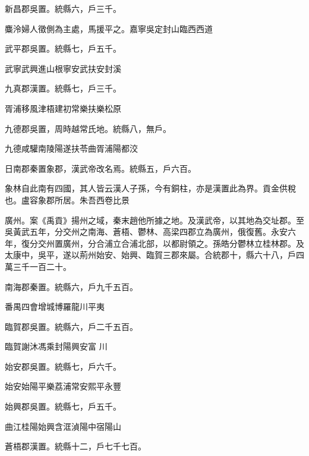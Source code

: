 \begin{pinyinscope}
 新昌郡吳置。統縣六，戶三千。



 麋泠婦人徵側為主處，馬援平之。嘉寧吳定封山臨西西道



 武平郡吳置。統縣七，戶五千。



 武寧武興進山根寧安武扶安封溪



 九真郡漢置。統縣七，戶三千。



 胥浦移風津梧建初常樂扶樂松原



 九德郡吳置，周時越常氏地。統縣八，無戶。



 九德咸驩南陵陽遂扶苓曲胥浦陽都洨



 日南郡秦置象郡，漢武帝改名焉。統縣五，戶六百。



 象林自此南有四國，其人皆云漢人子孫，今有銅柱，亦是漢置此為界。貢金供稅也。盧容象郡所居。朱吾西卷比景



 廣州。案《禹貢》揚州之域，秦末趙他所據之地。及漢武帝，以其地為交址郡。至吳黃武五年，分交州之南海、蒼梧、鬱林、高梁四郡立為廣州，俄復舊。永安六年，復分交州置廣州，分合浦立合浦北部，以都尉領之。孫皓分鬱林立桂林郡。及太康中，吳平，遂以荊州始安、始興、臨賀三郡來屬。合統郡十，縣六十八，戶四萬三千一百二十。



 南海郡秦置。統縣六，戶九千五百。



 番禺四會增城博羅龍川平夷



 臨賀郡吳置。統縣六，戶二千五百。



 臨賀謝沐馮乘封陽興安富
 川



 始安郡吳置。統縣七，戶六千。



 始安始陽平樂荔浦常安熙平永豐



 始興郡吳置。統縣七，戶五千。



 曲江桂陽始興含洭湞陽中宿陽山



 蒼梧郡漢置。統縣十二，戶七千七百。




\end{pinyinscope}
